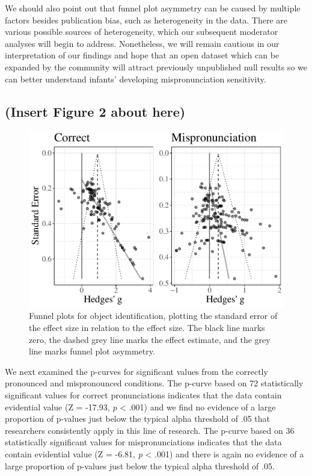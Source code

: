 \documentclass[man]{apa6}
\begin{document}
We should also point out that funnel plot asymmetry can be caused by multiple factors besides publication bias, such as heterogeneity in the data. There are various possible sources of heterogeneity, which our subsequent moderator analyses will begin to address. Nonetheless, we will remain cautious in our interpretation of our findings and hope that an open dataset which can be expanded by the community will attract previously unpublished null results so we can better understand infants' developing mispronunciation sensitivity.

\hypertarget{insert-figure-2-about-here}{%
\subsection{(Insert Figure 2 about here)}\label{insert-figure-2-about-here}}

\begin{figure}
\centering
\includegraphics{VonHolzenBergmann_MPMetaAnalysis_files/figure-latex/FunnelCombo-1.pdf}
\caption{\label{fig:FunnelCombo}Funnel plots for object identification, plotting the standard error of the effect size in relation to the effect size. The black line marks zero, the dashed grey line marks the effect estimate, and the grey line marks funnel plot asymmetry.}
\end{figure}

We next examined the p-curves for significant values from the correctly pronounced and mispronounced conditions. The p-curve based on 72 statistically significant values for correct pronunciations indicates that the data contain evidential value (Z = -17.93, \emph{p} \textless{} .001) and we find no evidence of a large proportion of p-values just below the typical alpha threshold of .05 that researchers consistently apply in this line of research. The p-curve based on 36 statistically significant values for mispronunciations indicates that the data contain evidential value (Z = -6.81, \emph{p} \textless{} .001) and there is again no evidence of a large proportion of p-values just below the typical alpha threshold of .05.
\end{document}
